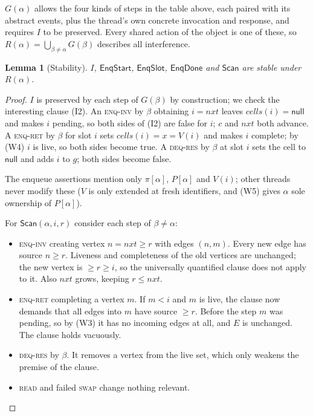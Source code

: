 \documentclass[11pt]{article}
\newtheorem{lemma}{Lemma}[section]
\theoremstyle{definition}
\theoremstyle{remark}
\newcommand{\nul}{\mathsf{null}}
\newcommand{\Scan}{\mathsf{Scan}}
\newcommand{\tokens}{\pi}
\newcommand{\ms}[1]{\mathsf{#1}}
\begin{document}
$G(\alpha)$ allows the four kinds of steps in the table above, each paired
with its abstract events, plus the thread's own concrete invocation and
response, and requires $I$ to be preserved.  Every shared action of the
object is one of these, so $R(\alpha) = \bigcup_{\beta\ne\alpha} G(\beta)$
describes all interference.

\begin{lemma}[Stability]\label{lem:stable}
$I$, $\ms{EnqStart}$, $\ms{EnqSlot}$, $\ms{EnqDone}$ and $\Scan$ are stable
under $R(\alpha)$.
\end{lemma}

\begin{proof}
$I$ is preserved by each step of $G(\beta)$ by construction; we check the
interesting clause (I2).  An \textsc{enq-inv} by $\beta$ obtaining $i =
\mathit{nxt}$ leaves $\mathit{cells}(i) = \nul$ and makes $i$ pending, so
both sides of (I2) are false for $i$; $c$ and $\mathit{nxt}$ both advance.
A \textsc{enq-ret} by $\beta$ for slot $i$ sets $\mathit{cells}(i) = x =
V(i)$ and makes $i$ complete; by (W4) $i$ is live, so both sides become true.
A \textsc{deq-res} by $\beta$ at slot $i$ sets the cell to $\nul$ and adds
$i$ to $g$; both sides become false.

The enqueue assertions mention only $\tokens[\alpha]$, $P[\alpha]$ and
$V(i)$; other threads never modify these ($V$ is only extended at fresh
identifiers, and (W5) gives $\alpha$ sole ownership of $P[\alpha]$).

For $\Scan(\alpha, i, r)$ consider each step of $\beta \ne \alpha$:
\begin{itemize}[nosep]
\item \textsc{enq-inv} creating vertex $n = \mathit{nxt} \ge r$ with edges
  $(n, m)$.  Every new edge has source $n \ge r$.  Liveness and completeness
  of the old vertices are unchanged; the new vertex is $\ge r \ge i$, so the
  universally quantified clause does not apply to it.  Also $\mathit{nxt}$
  grows, keeping $r \le \mathit{nxt}$.
\item \textsc{enq-ret} completing a vertex $m$.  If $m < i$ and $m$ is live,
  the clause now demands that all edges into $m$ have source $\ge r$.  Before
  the step $m$ was pending, so by (W3) it has no incoming edges at all, and
  $E$ is unchanged.  The clause holds vacuously.
\item \textsc{deq-res} by $\beta$.  It removes a vertex from the live set,
  which only weakens the premise of the clause.
\item \textsc{read} and failed \textsc{swap} change nothing relevant. \qedhere
\end{itemize}
\end{proof}
\end{document}

